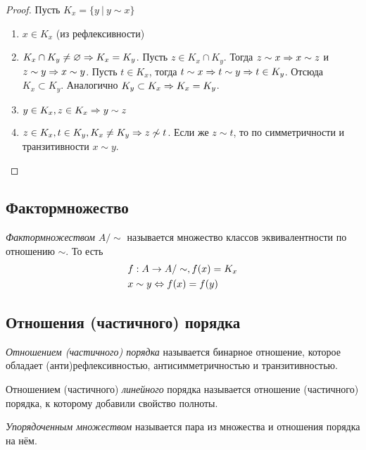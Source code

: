 \begin{proof}
	Пусть $K_x = \{y\ |\ y \sim x\}$
	
	\begin{enumerate}
		\item $x \in K_x$ (из рефлексивности)
		\item $K_x \cap K_y \neq \varnothing \Rightarrow K_x = K_y$. Пусть $z \in K_x \cap K_y$. Тогда $z \sim x \Rightarrow x \sim z$ и $z \sim y \Rightarrow x \sim y$. Пусть $t \in K_x$, тогда $t \sim x \Rightarrow t \sim y \Rightarrow t \in K_y$. Отсюда $K_x \subset K_y$. Аналогично $K_y \subset K_x \Rightarrow K_x = K_y$.
		\item $y \in K_x, z \in K_x \Rightarrow y \sim z$
		\item $z \in K_x, t \in K_y, K_x \neq K_y \Rightarrow z \not\sim t$. Если же $z \sim t$, то по симметричности и транзитивности $x \sim y$.
	\end{enumerate}
\end{proof}

\subsection{Фактормножество}

\begin{definition}
	\textit{Фактормножеством} $A/\sim$ называется множество классов эквивалентности по отношению $\sim$. То есть
	\begin{align*}
		&f : A \rightarrow A/\sim, f(x) = K_x
		\\
		&x \sim y \Leftrightarrow f(x) = f(y)
	\end{align*}
\end{definition}

\subsection{Отношения (частичного) порядка}

\begin{definition}
	\textit{Отношением (частичного) порядка} называется бинарное отношение, которое обладает (анти)рефлексивностью, антисимметричностью и транзитивностью.
\end{definition}

\begin{definition}
	Отношением (частичного) \textit{линейного} порядка называется отношение (частичного) порядка, к которому добавили свойство полноты.
\end{definition}

\begin{definition}
	\textit{Упорядоченным множеством} называется пара из множества и отношения порядка на нём.
\end{definition}

